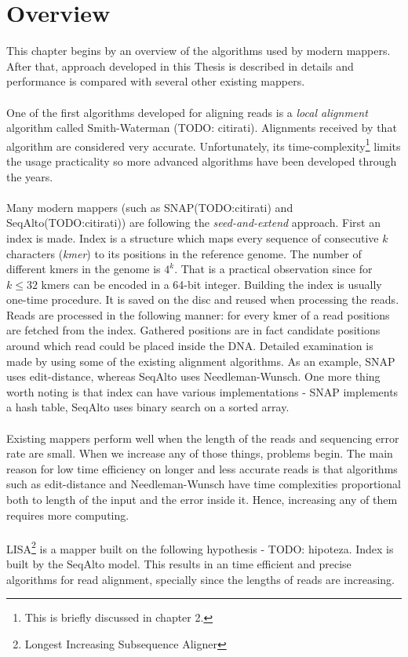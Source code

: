 \documentclass[times, utf8, diplomski]{fer}
\begin{document}
\section{Overview}
This chapter begins by an overview of the algorithms used by modern mappers. After that, approach developed in this Thesis is described in details and performance is compared with several other existing mappers.\\
\\
One of the first algorithms developed for aligning reads is a \emph{local alignment} algorithm called Smith-Waterman (TODO: citirati). Alignments received by that algorithm are considered very accurate. Unfortunately, its time-complexity\footnote{This is briefly discussed in chapter 2.} limits the usage practicality so more advanced algorithms have been developed through the years.\\
\\
Many modern mappers (such as SNAP(TODO:citirati) and SeqAlto(TODO:citirati)) are following the \emph{seed-and-extend} approach. First an index is made. Index is a structure which maps every sequence of consecutive $k$ characters (\emph{kmer}) to its positions in the reference genome. The number of different kmers in the genome is $4^k$. That is a practical observation since for $k \le 32$ kmers can be encoded in a 64-bit integer. Building the index is usually one-time procedure. It is saved on the disc and reused when processing the reads. Reads are processed in the following manner: for every kmer of a read positions are fetched from the index. Gathered positions are in fact candidate positions around which read could be placed inside the DNA. Detailed examination is made by using some of the existing alignment algorithms. As an example, SNAP uses edit-distance, whereas SeqAlto uses Needleman-Wunsch. One more thing worth noting is that index can have various implementations - SNAP implements a hash table, SeqAlto uses binary search on a sorted array.\\
\\
Existing mappers perform well when the length of the reads and sequencing error rate are small. When we increase any of those things, problems begin. The main reason for low time efficiency on longer and less accurate reads is that algorithms such as edit-distance and Needleman-Wunsch have time complexities proportional both to length of the input and the error inside it. Hence, increasing any of them requires more computing.\\
\\
LISA\footnote{Longest Increasing Subsequence Aligner} is a mapper built on the following hypothesis - TODO: hipoteza. Index is built by the SeqAlto model. This results in an time efficient and precise algorithms for read alignment, specially since the lengths of reads are increasing.
\end{document}
